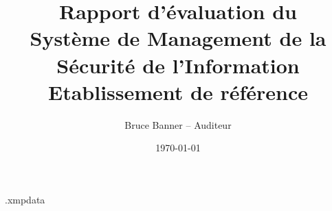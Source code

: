 \begin{filecontents*}{\jobname.xmpdata}
\end{filecontents*}

\documentclass[a4paper,10pt]{article}



\title{Rapport d'évaluation du\\Système de Management de la Sécurité de l'Information\\ \textcolor{myRed}{Etablissement de référence}}

\author{Bruce Banner -- \textcolor{myRed}{Auditeur}}

\date{\today}



\renewcommand{\labelitemi}{\ensuremath{\bullet}}
\renewcommand{\labelitemii}{\ensuremath{\circ}}
\renewcommand{\labelitemiii}{\ensuremath{\triangleright}}

\maketitle

\bigskip\bigskip\bigskip


\bigskip\bigskip\bigskip

\begin{itemize}
\item Directeur de l'établissement: \textsl{ }
\item RSSI de l'établissement: \textsl{Donald Blake}
\end{itemize}

\bigskip\bigskip\bigskip

\begin{center}
\Large{\textcolor{myRed}{Rapport validé}}
\end{center}

\bigskip\bigskip\bigskip

\begin{flushright}
\textcolor{myRed}{Original signé}

\textcolor{myRed}{Bruce Banner}\end{flushright}

